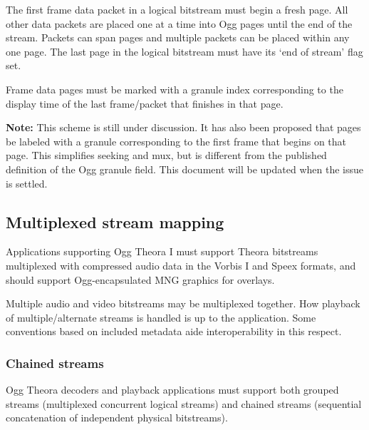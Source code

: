 \documentclass[11pt,letterpaper]{article}
\begin{document}
The first frame data packet in a logical bitstream must begin a fresh page.
All other data packets are placed one at a time into Ogg pages
 until the end of the stream.
Packets can span pages and multiple packets can be placed within any
 one page.
The last page in the logical bitstream must have its `end of stream'
 flag set.

Frame data pages must be marked with a granule index corresponding to
 the display time of the last frame/packet that finishes in that page.

{\bf Note:}
This scheme is still under discussion.
It has also been proposed that pages be labeled with a granule corresponding to
 the first frame that begins on that page.
This simplifies seeking and mux, but is different from the published
 definition of the Ogg granule field.
This document will be updated when the issue is settled.


\subsection{Multiplexed stream mapping}

Applications supporting Ogg Theora I must support Theora bitstreams
 multiplexed with compressed audio data in the Vorbis I and Speex
 formats, and should support Ogg-encapsulated MNG graphics for overlays.

Multiple audio and video bitstreams may be multiplexed together.
How playback of multiple/alternate streams is handled is up to the
 application.
Some conventions based on included metadata aide interoperability
 in this respect.

\subsubsection{Chained streams}

Ogg Theora decoders and playback applications must support both grouped
 streams (multiplexed concurrent logical streams) and chained streams
 (sequential concatenation of independent physical bitstreams).
\end{document}
